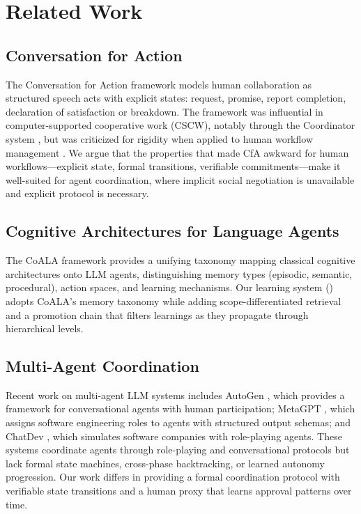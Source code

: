 \documentclass[11pt,a4paper]{article}
\begin{document}
\section{Related Work}
\label{sec:related}

\subsection{Conversation for Action}

The Conversation for Action framework \citep{winograd1986understanding}
models human collaboration as structured speech acts with explicit states:
request, promise, report completion, declaration of satisfaction or
breakdown. The framework was influential in computer-supported cooperative
work (CSCW), notably through the Coordinator system
\citep{flores1988computer}, but was criticized for rigidity when applied to
human workflow management \citep{suchman1994plans}. We argue that the
properties that made CfA awkward for human workflows---explicit state,
formal transitions, verifiable commitments---make it well-suited for
agent coordination, where implicit social negotiation is unavailable and
explicit protocol is necessary.

\subsection{Cognitive Architectures for Language Agents}

The CoALA framework \citep{sumers2024cognitive} provides a unifying taxonomy
mapping classical cognitive architectures onto LLM agents, distinguishing
memory types (episodic, semantic, procedural), action spaces, and learning
mechanisms. Our learning system () adopts CoALA's
memory taxonomy while adding scope-differentiated retrieval and a promotion
chain that filters learnings as they propagate through hierarchical levels.

\subsection{Multi-Agent Coordination}

Recent work on multi-agent LLM systems includes
AutoGen \citep{wu2023autogen}, which provides a framework for conversational
agents with human participation;
MetaGPT \citep{hong2023metagpt}, which assigns software engineering roles to
agents with structured output schemas; and
ChatDev \citep{qian2024chatdev}, which simulates software companies with
role-playing agents. These systems coordinate agents through role-playing and
conversational protocols but lack formal state machines, cross-phase
backtracking, or learned autonomy progression. Our work differs in providing
a formal coordination protocol with verifiable state transitions and
a human proxy that learns approval patterns over time.
\end{document}
